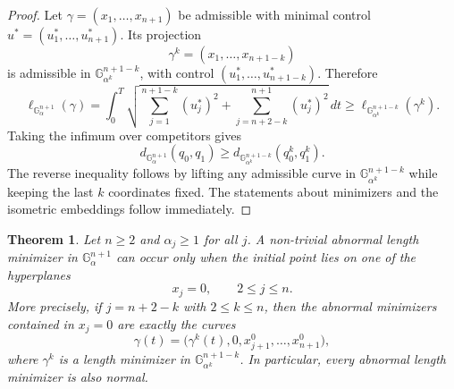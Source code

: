 \documentclass[12pt]{amsart}
\numberwithin{equation}{section}
\theoremstyle{plain}
\newtheorem{theorem}{Theorem}[section]
\theoremstyle{definition}
\theoremstyle{remark}
\begin{document}
\begin{proof}
    Let \(\gamma=(x_1,\ldots,x_{n+1})\) be admissible with minimal control
    \(u^*=(u_1^*,\ldots,u_{n+1}^*)\). Its projection
    \[
        \gamma^k=(x_1,\ldots,x_{n+1-k})
    \]
    is admissible in \(\mathbb G^{n+1-k}_{\alpha^k}\), with control
    \((u_1^*,\ldots,u_{n+1-k}^*)\). Therefore
    \[
        \ell_{\mathbb G^{n+1}_\alpha}(\gamma)
        =
        \int_0^T
        \sqrt{
            \sum_{j=1}^{n+1-k}(u_j^*)^2
            +
            \sum_{j=n+2-k}^{n+1}(u_j^*)^2
        }\,dt
        \geq
        \ell_{\mathbb G^{n+1-k}_{\alpha^k}}(\gamma^k).
    \]
    Taking the infimum over competitors gives
    \[
        d_{\mathbb G^{n+1}_\alpha}(q_0,q_1)
        \geq
        d_{\mathbb G^{n+1-k}_{\alpha^k}}(q_0^k,q_1^k).
    \]
    The reverse inequality follows by lifting any admissible curve in
    \(\mathbb G^{n+1-k}_{\alpha^k}\) while keeping the last \(k\) coordinates fixed. The
    statements about minimizers and the isometric embeddings follow immediately.
\end{proof}

\begin{theorem}\label{abnormality}
    Let \(n\geq 2\) and \(\alpha_j\geq 1\) for all \(j\). A non-trivial abnormal length
    minimizer in \(\mathbb G^{n+1}_\alpha\) can occur only when the initial point lies on one
    of the hyperplanes
    \[
        x_j=0,\qquad 2\leq j\leq n.
    \]
    More precisely, if \(j=n+2-k\) with \(2\leq k\leq n\), then the abnormal minimizers
    contained in \(x_j=0\) are exactly the curves
    \[
        \gamma(t)
        =
        \bigl(\gamma^k(t),0,x_{j+1}^0,\ldots,x_{n+1}^0\bigr),
    \]
    where \(\gamma^k\) is a length minimizer in
    \(\mathbb G^{n+1-k}_{\alpha^k}\). In particular, every abnormal length minimizer is also
    normal.
\end{theorem}
\end{document}
